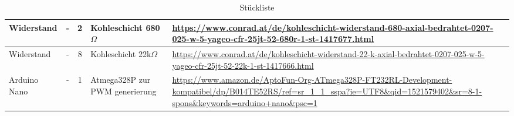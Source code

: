 \begin{table}[htb]
\begin{tiny}
\begin{tabular}{|p{2cm}|c|c|p{3cm}|p{7cm}|}
Widerstand & - & 2 & Kohleschicht 680$\Omega$ & \url{https://www.conrad.at/de/kohleschicht-widerstand-680-axial-bedrahtet-0207-025-w-5-yageo-cfr-25jt-52-680r-1-st-1417677.html} \\ \hline
Widerstand & - & 8 & Kohleschicht 22k$\Omega$ & \url{https://www.conrad.at/de/kohleschicht-widerstand-22-k-axial-bedrahtet-0207-025-w-5-yageo-cfr-25jt-52-22k-1-st-1417666.html} \\ \hline
Arduino Nano & - & 1 & Atmega328P zur PWM generierung & \url{https://www.amazon.de/AptoFun-Org-ATmega328P-FT232RL-Development-kompatibel/dp/B014TE52RS/ref=sr_1_1_sspa?ie=UTF8&qid=1521579402&sr=8-1-spons&keywords=arduino+nano&psc=1} \\ \hline
\end{tabular}
\caption{Stückliste}
\label{Parts list}
\end{tiny}
\end{table}
\newpage
